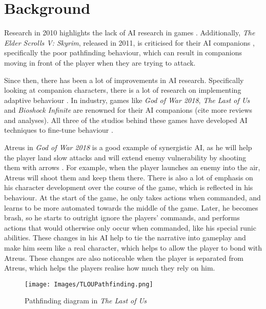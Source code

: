 \documentclass{IEEEtran}
\begin{document}
\section{Background}
\label{Background}

Research in 2010 highlights the lack of AI research in games \cite{RealTimeAICritique2010}. Additionally, \textit{The Elder Scrolls V: Skyrim}, released in 2011, is criticised for their AI companions \cite{tremblay2013adaptive}, specifically the poor pathfinding behaviour, which can result in companions moving in front of the player when they are trying to attack.

Since then, there has been a lot of improvements in AI research. Specifically looking at companion characters, there is a lot of research on implementing adaptive behaviour \cite{tremblay2013adaptive, CompanionBotsFPS2019, GeneratingCollabBehaviourPlanRecognition2016}. In industry, games like \textit{God of War 2018}, \textit{The Last of Us} and \textit{Bioshock Infinite} are renowned for their AI companions \cite{PlayDontShow} (cite more reviews and analyses). All three of the studios behind these games have developed AI techniques to fine-tune behaviour \cite{GDCAtreus, GAIP2EllieAI, GDCElizabeth, AIGamesBioshockAI}.

Atreus in \textit{God of War 2018} is a good example of synergistic AI, as he will help the player land slow attacks and will extend enemy vulnerability by shooting them with arrows \cite{GDCAtreus}. For example, when the player launches an enemy into the air, Atreus will shoot them and keep them there. There is also a lot of emphasis on his character development over the course of the game, which is reflected in his behaviour. At the start of the game, he only takes actions when commanded, and learns to be more automated towards the middle of the game. Later, he becomes brash, so he starts to outright ignore the players’ commands, and performs actions that would otherwise only occur when commanded, like his special runic abilities. These changes in his AI help to tie the narrative into gameplay and make him seem like a real character, which helps to allow the player to bond with Atreus. These changes are also noticeable when the player is separated from Atreus, which helps the players realise how much they rely on him.

\begin{figure}
  \centering
  \texttt{[image: Images/TLOUPathfinding.png]}
  
\caption{Pathfinding diagram in \textit{The Last of Us}}
\label{fig:TLOUPathfinding}
\end{figure}
\end{document}
